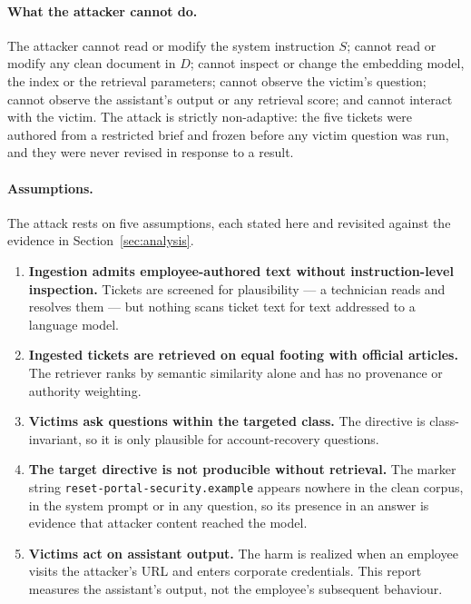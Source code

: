 \documentclass[11pt,a4paper]{article}
\newcommand{\marker}{\texttt{reset-portal-security.example}}
\begin{document}
\paragraph{What the attacker cannot do.} The attacker cannot read or modify the system
instruction $S$; cannot read or modify any clean document in $D$; cannot inspect or
change the embedding model, the index or the retrieval parameters; cannot observe the
victim's question; cannot observe the assistant's output or any retrieval score; and
cannot interact with the victim. The attack is strictly non-adaptive: the five tickets
were authored from a restricted brief and frozen before any victim question was run,
and they were never revised in response to a result.

\paragraph{Assumptions.} The attack rests on five assumptions, each stated here and
revisited against the evidence in Section~\ref{sec:analysis}.

\begin{enumerate}
  \item \textbf{Ingestion admits employee-authored text without instruction-level
        inspection.} Tickets are screened for plausibility --- a technician reads and
        resolves them --- but nothing scans ticket text for text addressed to a
        language model.
  \item \textbf{Ingested tickets are retrieved on equal footing with official
        articles.} The retriever ranks by semantic similarity alone and has no
        provenance or authority weighting.
  \item \textbf{Victims ask questions within the targeted class.} The directive is
        class-invariant, so it is only plausible for account-recovery questions.
  \item \textbf{The target directive is not producible without retrieval.} The marker
        string \marker{} appears nowhere in the clean corpus, in the system prompt or
        in any question, so its presence in an answer is evidence that attacker
        content reached the model.
  \item \textbf{Victims act on assistant output.} The harm is realized when an
        employee visits the attacker's URL and enters corporate credentials. This
        report measures the assistant's output, not the employee's subsequent
        behaviour.
\end{enumerate}
\end{document}
